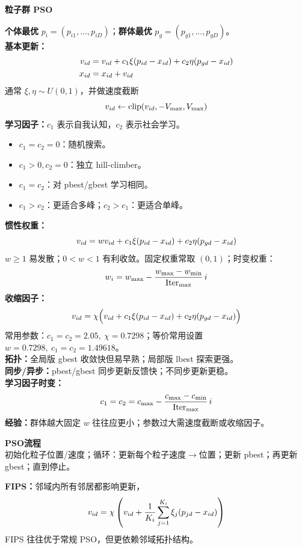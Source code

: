 \documentclass[8pt,a4paper]{ctexart}
\newcommand{\blk}[1]{%
  \par\needspace{2.2\baselineskip}%
  \vspace{1pt}\noindent
  \colorbox{black!10}{\parbox{\dimexpr\columnwidth-2\fboxsep\relax}{\textbf{#1}}}\par
  \vspace{1pt}}
\newcommand{\tightmath}[1]{\[
\vspace{-5pt}#1\vspace{-5pt}
\]}
\newcommand{\codebox}[1]{\begin{tcolorbox}#1\end{tcolorbox}}
\begin{document}
\begin{multicols*}{3}
\blk{粒子群 PSO}
\textbf{个体最优} $p_i=(p_{i1},...,p_{iD})$；\textbf{群体最优} $p_g=(p_{g1},...,p_{gD})$。\\
\textbf{基本更新：}
\tightmath{
\begin{aligned}
v_{id}&=v_{id}+c_1\xi(p_{id}-x_{id})+c_2\eta(p_{gd}-x_{id})\\
x_{id}&=x_{id}+v_{id}
\end{aligned}}
通常 $\xi,\eta\sim U(0,1)$，并做速度截断
\tightmath{v_{id}\leftarrow \mathrm{clip}(v_{id},-V_{\max},V_{\max})}
\textbf{学习因子：}$c_1$ 表示自我认知，$c_2$ 表示社会学习。
\begin{itemize}
\item $c_1=c_2=0$：随机搜索。
\item $c_1>0,c_2=0$：独立 hill-climber。
\item $c_1=c_2$：对 pbest/gbest 学习相同。
\item $c_1>c_2$：更适合多峰；$c_2>c_1$：更适合单峰。
\end{itemize}
\textbf{惯性权重：}
\tightmath{v_{id}=w v_{id}+c_1\xi(p_{id}-x_{id})+c_2\eta(p_{gd}-x_{id})}
$w\ge1$ 易发散；$0<w<1$ 有利收敛。固定权重常取 $(0,1)$；时变权重：
\tightmath{w_i=w_{\max}-\frac{w_{\max}-w_{\min}}{\mathrm{Iter}_{\max}}\,i}
\textbf{收缩因子：}
\tightmath{v_{id}=\chi\Big(v_{id}+c_1\xi(p_{id}-x_{id})+c_2\eta(p_{gd}-x_{id})\Big)}
常用参数：$c_1=c_2=2.05,\ \chi=0.7298$；等价常用设置 $w=0.7298,\ c_1=c_2=1.49618$。\\
\textbf{拓扑：}全局版 gbest 收敛快但易早熟；局部版 lbest 探索更强。\\
\textbf{同步/异步：}pbest/gbest 同步更新反馈快；不同步更新更稳。\\
\textbf{学习因子时变：}
\tightmath{c_1=c_2=c_{\max}-\frac{c_{\max}-c_{\min}}{\mathrm{Iter}_{\max}}\,i}
\textbf{经验：}群体越大固定 $w$ 往往应更小；参数过大需速度截断或收缩因子。\\
\codebox{
\textbf{PSO流程}\\
初始化粒子位置/速度；循环：更新每个粒子速度$\to$位置；更新 pbest；再更新 gbest；直到停止。
}
\textbf{FIPS：}邻域内所有邻居都影响更新，
\tightmath{v_{id}=\chi\left(v_{id}+\frac1{K_i}\sum_{j=1}^{K_i}\xi_j(p_{jd}-x_{id})\right)}
FIPS 往往优于常规 PSO，但更依赖邻域拓扑结构。


\end{multicols*}
\end{document}
